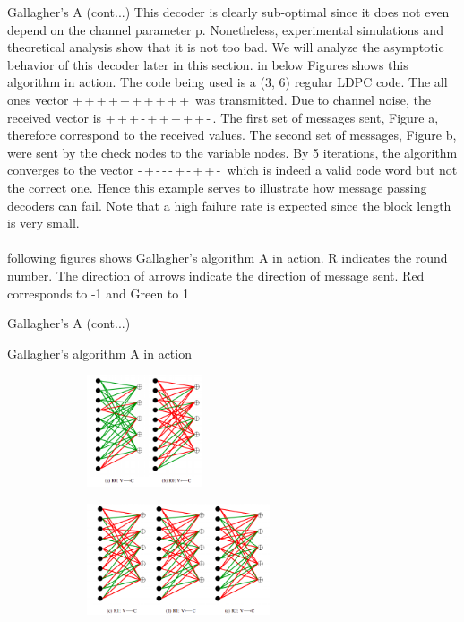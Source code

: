 \begin{frame}{Gallagher's A (cont...)}
\;\;\;\;\;\;\;\; This decoder is clearly sub-optimal since it does not even depend on the channel parameter p. Nonetheless, experimental simulations and theoretical analysis show that it is not too bad. We will analyze the asymptotic behavior of this decoder later in this section. in below Figures 
shows this algorithm in action. The code being used is a (3, 6) regular LDPC code. The all ones vector +\,+\,+\,+\,+\,+\,+\,+\,+\,+\, was transmitted. Due to channel noise, the received vector is +\,+\,+\,-\,+\,+\,+\,+\,+\,-\,. The first set of messages sent, Figure a, therefore correspond to the received values. The second set of messages, Figure b, were sent by the check nodes to the variable nodes. By 5 iterations, the algorithm converges to the vector -\,+\,-\,-\,-\,+\,-\,+\,+\,-\, which is indeed a valid code word but not the correct one. Hence this example serves to illustrate how message passing decoders can fail. Note that a high failure rate is expected since the block length is very small.\\~\\
following figures shows Gallagher’s algorithm A in action. R indicates the round number. The direction of arrows indicate the direction of message sent. Red corresponds to -1 and Green to 1    
\end{frame}
\begin{frame}{Gallagher's A (cont...)}
\begin{exampleblock}{Gallagher’s algorithm A in action}

\begin{figure}
			\includegraphics[width=6cm, height=3.3cm]{BSC/gallaghar fig 2a.png}
			\label{fig2a}
\end{figure}
\begin{figure}
			\includegraphics[width=8cm, height=3.3cm]{BSC/gallaghar fig 2b.png}
			\label{fig2b}
\end{figure}
\end{exampleblock}

\end{frame}

